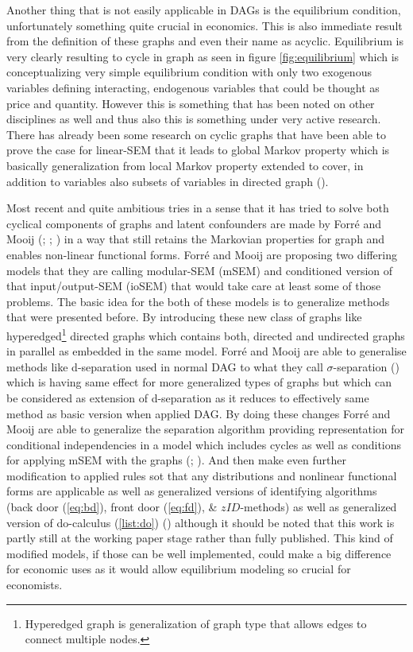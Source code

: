 \documentclass[main=english,12pt,a4paper,pdftex,econ,utf8]{aaltothesis}
\begin{document}


Another thing that is not easily applicable in DAGs is the equilibrium condition, unfortunately something quite crucial in economics. This is also immediate result from the definition of these graphs and even their name as acyclic. Equilibrium is very clearly resulting to cycle in graph as seen in figure \ref{fig:equilibrium} which is conceptualizing very simple equilibrium condition with only two exogenous variables defining interacting, endogenous variables that could be thought as price and quantity. However this is something that has been noted on other disciplines as well and thus also this is something under very active research. There has already been some research on cyclic graphs that have been able to prove the case for linear-SEM that it leads to global Markov property which is basically generalization from local Markov property extended to cover, in addition to variables also subsets of variables in directed graph (\cite{PeterSpirtes1994}).

Most recent and quite ambitious tries in a sense that it has tried to solve both cyclical components of graphs and latent confounders are made by Forré and Mooij (\cite{Forre2017}; \cite{Forre2018}; \cite{Forre2019}) in a way that still retains the Markovian properties for graph and enables non-linear functional forms. Forré and Mooij are proposing two differing models that they are calling modular-SEM (mSEM) and conditioned version of that input/output-SEM (ioSEM) that would take care at least some of those problems. The basic idea for the both of these models is to generalize methods that were presented before. By introducing these new class of graphs like hyperedged\footnote{Hyperedged graph is generalization of graph type that allows edges to connect multiple nodes.} directed graphs which contains both, directed and undirected graphs in parallel as embedded in the same model. Forré and Mooij are able to generalise methods like d-separation used in normal DAG to what they call $\sigma$-separation (\cite{Forre2017}) which is having same effect for more generalized types of graphs but which can be considered as extension of d-separation as it reduces to effectively same method as basic version when applied DAG. By doing these changes Forré and Mooij are able to generalize the separation algorithm providing representation for conditional independencies in a model which includes cycles as well as conditions for applying mSEM with the graphs (\cite{Forre2017}; \cite{Forre2018}). And then make even further modification to applied rules sot that any distributions and nonlinear functional forms are applicable as well as generalized versions of identifying algorithms (back door (\ref{eq:bd}), front door (\ref{eq:fd}), \& $zID$-methods) as well as generalized version of do-calculus (\ref{list:do})  (\cite{Forre2019}) although it should be noted that this work is partly still at the working paper stage rather than fully published. This kind of modified models, if those can be well implemented, could make a big difference for economic uses as it would allow equilibrium modeling so crucial for economists.
\end{document}

